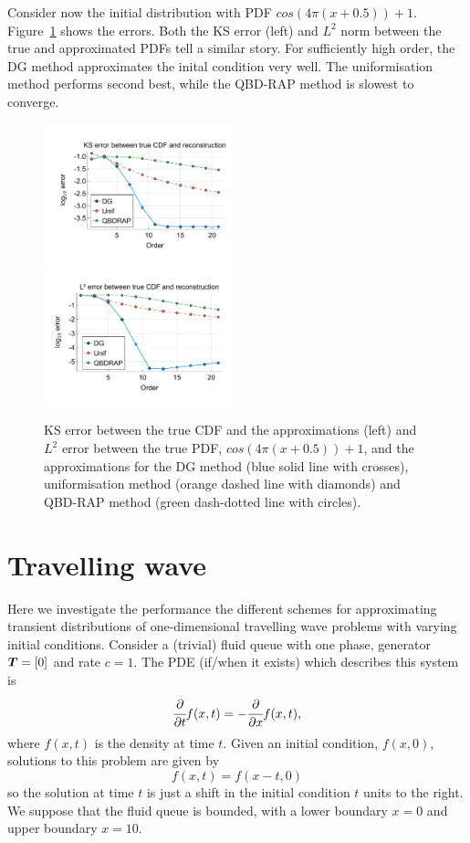 \begin{example}Consider now the initial distribution with PDF \(cos(4\pi(x+0.5))+1\). Figure~\ref{fig: fun 9 comp} shows the errors. Both the KS error (left) and \(L^2\) norm between the true and approximated PDFs tell a similar story. For sufficiently high order, the DG method approximates the inital condition very well. The uniformisation method performs second best, while the QBD-RAP method is slowest to converge. 
\begin{figure}
	\centering
	\includegraphics[width=0.5\textwidth,trim={1.25cm 0.8cm 0.25cm 1.25cm},clip]{chapter6/figs/comp/fun9/meshs_ks_error_formatted.pdf}%
	\includegraphics[width=0.5\textwidth,trim={1.25cm 0.8cm 0.25cm 1.25cm},clip]{chapter6/figs/comp/fun9/meshs_l2_pdf_error_formatted.pdf}
	\caption{KS error between the true CDF and the approximations (left) and \(L^2\) error between the true PDF, \(cos(4\pi(x+0.5))+1\), and the approximations for the DG method (blue solid line with crosses), uniformisation method (orange dashed line with diamonds) and QBD-RAP method (green dash-dotted line with circles).}
	\label{fig: fun 9 comp} 
\end{figure}
\end{example}
\FloatBarrier

\section{Travelling wave}
Here we investigate the performance the different schemes for approximating transient distributions of one-dimensional travelling wave problems with varying initial conditions. Consider a (trivial) fluid queue with one phase, generator \(\boldsymbol T=[0]\) and rate \(c=1\). The PDE (if/when it exists) which describes this system is 
\[\cfrac{\partial}{\partial t} f(x,t) = -\cfrac{\partial}{\partial x} f(x,t),\]
where \(f(x,t)\) is the density at time \(t\). Given an initial condition, \(f(x,0)\), solutions to this problem are given by 
\[f(x,t) = f(x-t,0)\]
so the solution at time \(t\) is just a shift in the initial condition \(t\) units to the right. We suppose that the fluid queue is bounded, with a lower boundary \(x=0\) and upper boundary \(x=10\). 

